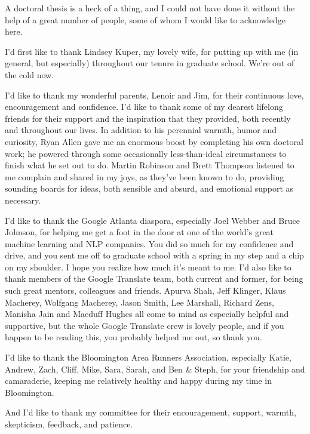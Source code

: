 
A doctoral thesis is a heck of a thing, and I could not have done it without
the help of a great number of people, some of whom I would like to acknowledge
here.

I'd first like to thank Lindsey Kuper, my lovely wife, for putting up with me
(in general, but especially) throughout our tenure in graduate school. We're
out of the cold now.

I'd like to thank my wonderful parents, Lenoir and Jim, for their continuous
love, encouragement and confidence.
I'd like to thank some of my dearest lifelong friends for their support and the
inspiration that they provided, both recently and throughout our lives.
In addition to his perennial warmth, humor and curiosity, Ryan Allen gave me an
enormous boost by completing his own doctoral work\cite{allen2017visions}; he
powered through some occasionally less-than-ideal circumstances to finish what
he set out to do. Martin Robinson and Brett Thompson listened to me complain
and shared in my joys, as they've been known to do, providing sounding boards
for ideas, both sensible and absurd, and emotional support as necessary.

I'd like to thank the Google Atlanta diaspora, especially Joel Webber and Bruce
Johnson, for helping me get a foot in the door at one of the world's great
machine learning and NLP companies. You did so much for my confidence and
drive, and you sent me off to graduate school with a spring in my step and a
chip on my shoulder. I hope you realize how much it's meant to me. I'd also
like to thank members of the Google Translate team, both current and former,
for being such great mentors, colleagues and friends. Apurva Shah, Jeff
Klinger, Klaus Macherey, Wolfgang Macherey, Jason Smith, Lee Marshall, Richard
Zens, Manisha Jain and Macduff Hughes all come to mind as especially helpful
and supportive, but the whole Google Translate crew is lovely people, and if
you happen to be reading this, you probably helped me out, so thank you.

I'd like to thank the Bloomington Area Runners Association, especially Katie,
Andrew, Zach, Cliff, Mike, Sara, Sarah, and Ben \& Steph, for your friendship
and camaraderie, keeping me relatively healthy and happy during my time in
Bloomington.

And I'd like to thank my committee for their encouragement, support, warmth,
skepticism, feedback, and patience.
